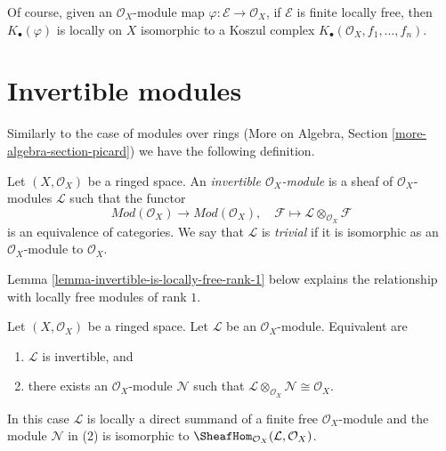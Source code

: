 \noindent
Of course, given an $\mathcal{O}_X$-module map
$\varphi : \mathcal{E} \to \mathcal{O}_X$,
if $\mathcal{E}$ is finite locally free, then
$K_\bullet(\varphi)$ is locally on $X$ isomorphic to a Koszul complex
$K_\bullet(\mathcal{O}_X, f_1, \ldots, f_n)$.



\section{Invertible modules}
\label{section-invertible}

\noindent
Similarly to the case of modules over rings
(More on Algebra, Section \ref{more-algebra-section-picard})
we have the following definition.

\begin{definition}
\label{definition-invertible}
Let $(X, \mathcal{O}_X)$ be a ringed space. An
{\it invertible $\mathcal{O}_X$-module} is a sheaf
of $\mathcal{O}_X$-modules $\mathcal{L}$ such that
the functor
$$
\textit{Mod}(\mathcal{O}_X) \longrightarrow \textit{Mod}(\mathcal{O}_X),\quad
\mathcal{F} \longmapsto \mathcal{L} \otimes_{\mathcal{O}_X} \mathcal{F}
$$
is an equivalence of categories. We say that $\mathcal{L}$ is
{\it trivial} if it is isomorphic as an $\mathcal{O}_X$-module
to $\mathcal{O}_X$.
\end{definition}

\noindent
Lemma \ref{lemma-invertible-is-locally-free-rank-1}
below explains the relationship with locally free modules
of rank $1$.

\begin{lemma}
\label{lemma-invertible}
Let $(X, \mathcal{O}_X)$ be a ringed space. Let $\mathcal{L}$
be an $\mathcal{O}_X$-module. Equivalent are
\begin{enumerate}
\item $\mathcal{L}$ is invertible, and
\item there exists an $\mathcal{O}_X$-module $\mathcal{N}$
such that
$\mathcal{L} \otimes_{\mathcal{O}_X} \mathcal{N} \cong \mathcal{O}_X$.
\end{enumerate}
In this case $\mathcal{L}$ is locally a direct summand of a finite free
$\mathcal{O}_X$-module and the module $\mathcal{N}$ in (2) is isomorphic to
$\SheafHom_{\mathcal{O}_X}(\mathcal{L}, \mathcal{O}_X)$.
\end{lemma}

